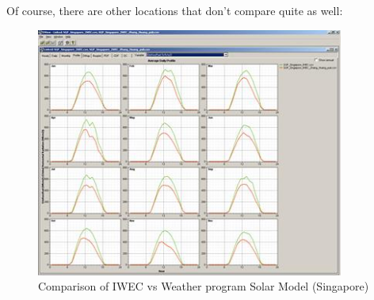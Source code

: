 Of course, there are other locations that don't compare quite as well:

\begin{figure}[hbtp] %
\centering
\includegraphics[width=0.9\textwidth, height=0.9\textheight, keepaspectratio=true]{media/image007.jpg}
\caption{Comparison of IWEC vs Weather program Solar Model (Singapore) \protect \label{fig:comparison-of-iwec-vs-weather-program-solar}}
\end{figure}
